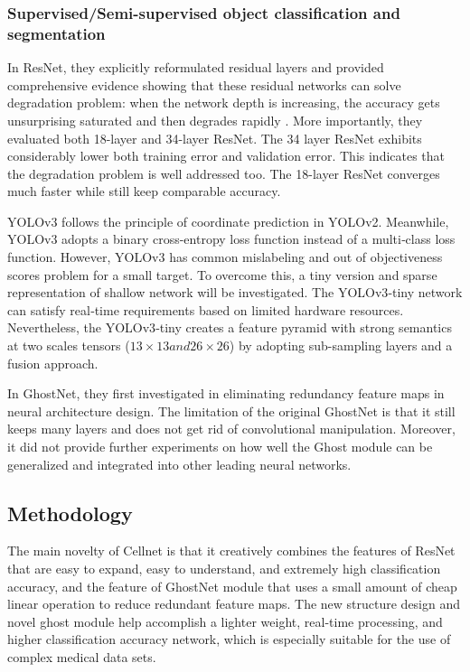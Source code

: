 {\subsubsection{Supervised/Semi-supervised object classification and segmentation}
In ResNet\cite{20}, they explicitly reformulated residual layers and provided comprehensive evidence showing that these residual networks can solve degradation problem: when the network depth is increasing, the accuracy gets unsurprising saturated and then degrades rapidly \cite{20}.
More importantly, they evaluated both 18-layer and 34-layer ResNet. The 34 layer ResNet exhibits considerably lower both training error and validation error. This indicates that the degradation problem is well addressed too. The 18-layer ResNet\cite{20} converges much faster while still keep comparable accuracy. 

YOLOv3 \cite{33} follows the principle of coordinate prediction in YOLOv2. 
Meanwhile, YOLOv3 adopts a binary cross-entropy loss function instead of a multi‐class loss function\cite{18}. However, YOLOv3 has common mislabeling and out of objectiveness scores problem for a small target. To overcome this, a tiny version and sparse representation of shallow network will be investigated. The YOLOv3‐tiny network can satisfy real‐time requirements based on limited hardware resources. Nevertheless, the YOLOv3‐tiny creates a feature pyramid with strong semantics at two scales tensors ($13 \times 13 and 26 \times 26$) by adopting sub-sampling layers and a fusion approach\cite{18}.

In GhostNet\cite{19}, they first investigated in eliminating redundancy feature maps in neural architecture design. The limitation of the original GhostNet \cite{19} is that it still keeps many layers and does not get rid of convolutional manipulation. Moreover, it did not provide further experiments on how well the Ghost module can be generalized and integrated into other leading neural networks.

\subsection{Methodology}
The main novelty of Cellnet is that it creatively combines the features of ResNet\cite{20} that are easy to expand, easy to understand, and extremely high classification accuracy, and the feature of GhostNet\cite{19} module that uses a small amount of cheap linear operation to reduce redundant feature maps. The new structure design and novel ghost module help accomplish a lighter weight, real-time processing, and higher classification accuracy network, which is especially suitable for the use of complex medical data sets.

}
